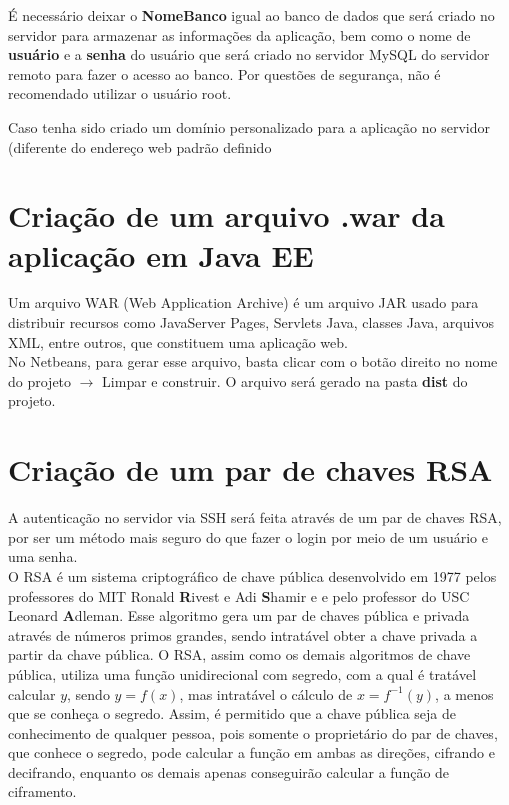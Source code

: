 \documentclass[11pt,a4paper]{report}
\begin{document}
É necessário deixar o \textbf{NomeBanco} igual ao banco de dados que será criado no servidor para armazenar as informações da aplicação, bem como o nome de \textbf{usuário} e a \textbf{senha} do usuário que será criado no servidor MySQL do servidor remoto para fazer o acesso ao banco. Por questões de segurança, não é recomendado utilizar o usuário root.

Caso tenha sido criado um domínio personalizado para a aplicação no servidor (diferente do endereço web padrão definido 


\section{Criação de um arquivo .war da aplicação em Java EE}

Um arquivo WAR (Web Application Archive) é um arquivo JAR usado para distribuir recursos como JavaServer Pages, Servlets Java, classes Java, arquivos XML, entre outros, que constituem uma aplicação web. \\

No Netbeans, para gerar esse arquivo, basta clicar com o botão direito no nome do projeto $\rightarrow$ Limpar e construir. O arquivo será gerado na pasta \textbf{dist} do projeto. 



\section{Criação de um par de chaves RSA}

A autenticação no servidor via SSH será feita através de um par de chaves RSA, por ser um método mais seguro do que fazer o login por meio de um usuário e uma senha. \\

O RSA é um sistema criptográfico de chave pública desenvolvido em 1977 pelos professores do MIT Ronald \textbf{R}ivest e Adi \textbf{S}hamir e  e pelo professor do USC Leonard \textbf{A}dleman. Esse algoritmo gera um par de chaves pública e privada através de números primos grandes, sendo intratável obter a chave privada a partir da chave pública. O RSA, assim como os demais algoritmos de chave pública, utiliza uma função unidirecional com segredo, com a qual é tratável calcular $y$, sendo $y = f(x)$, mas intratável o cálculo de $x = f^{-1}(y)$, a menos que se conheça o segredo. Assim, é permitido que a chave pública seja de conhecimento de qualquer pessoa, pois somente o proprietário do par de chaves, que conhece o segredo, pode calcular a função em ambas as direções, cifrando e decifrando, enquanto os demais apenas conseguirão calcular a função de ciframento. \cite{pereira2008sistema}\\
\end{document}
